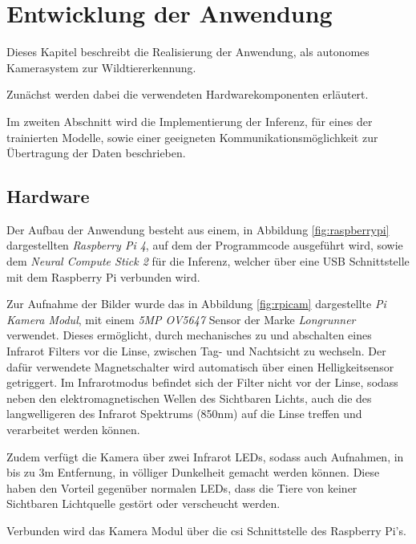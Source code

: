 
\chapter{Entwicklung der Anwendung}\label{kap:application}


Dieses Kapitel beschreibt die Realisierung der
Anwendung, als autonomes Kamerasystem zur
Wildtiererkennung.

Zunächst werden dabei die verwendeten Hardwarekomponenten 
erläutert.

Im zweiten Abschnitt wird die Implementierung der 
Inferenz, für eines der trainierten Modelle, 
sowie einer geeigneten Kommunikationsmöglichkeit 
zur Übertragung der Daten beschrieben.


\section{Hardware}\label{sec:aufbau}


Der Aufbau der Anwendung besteht aus einem, in Abbildung 
\ref{fig:raspberrypi} dargestellten \textit{Raspberry Pi 4},
auf dem der Programmcode ausgeführt wird,
sowie dem \textit{Neural Compute Stick 2}
 für die Inferenz, welcher über eine USB Schnittstelle
mit dem Raspberry Pi verbunden wird.

Zur Aufnahme der Bilder wurde das in 
Abbildung \ref{fig:rpicam} dargestellte 
\textit{Pi Kamera Modul},
mit einem \textit{5MP OV5647} Sensor der Marke \textit{Longrunner}
verwendet.
Dieses ermöglicht, durch mechanisches zu und abschalten
eines Infrarot Filters vor die Linse, zwischen Tag- und
Nachtsicht zu wechseln.
Der dafür verwendete Magnetschalter wird automatisch 
über einen Helligkeitsensor getriggert.
Im Infrarotmodus befindet sich der Filter nicht 
vor der Linse, sodass neben den elektromagnetischen 
Wellen des Sichtbaren Lichts, auch die des 
langwelligeren des Infrarot Spektrums (850nm) 
auf die Linse treffen und verarbeitet werden können.

Zudem verfügt die Kamera über zwei Infrarot LEDs, 
sodass auch Aufnahmen, in bis zu 3m Entfernung,
in völliger Dunkelheit gemacht werden können.
Diese haben den Vorteil gegenüber normalen LEDs, 
dass die Tiere von keiner Sichtbaren Lichtquelle 
gestört oder verscheucht werden.

Verbunden wird das Kamera Modul über die \Gls{csi}
Schnittstelle des Raspberry Pi's.


